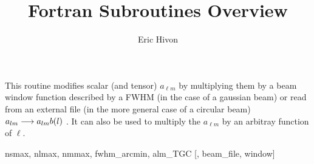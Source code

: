 
\sloppy


\title{\healpix Fortran Subroutines Overview}
 \section[alter\_alm*]{ }
\label{sub:alter_alm}
\author{Eric Hivon}

\begin{facility}
{This routine modifies scalar (and tensor) $a_{\ell m}$ by multiplying them by a beam window
  function described by a FWHM (in the case of a gaussian beam) or read from an external
  file (in the more general case of a circular beam)  $a_{l m}
  \longrightarrow a_{l m} b(l)$ . It can also be used to
  multiply the  $a_{\ell m}$ by an arbitray function of $\ell$.}
{\modAlmTools}
\end{facility}

\begin{f90format}
{nsmax, nlmax, nmmax, fwhm\_arcmin, alm\_TGC [, beam\_file, window]}
\end{f90format}

